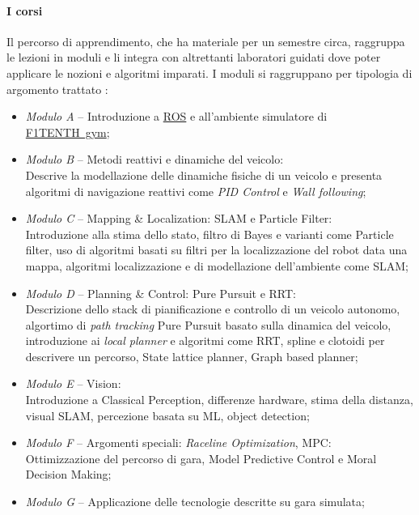 \paragraph{I corsi}
Il percorso di apprendimento, che ha materiale per un semestre circa,
raggruppa le lezioni in moduli e li integra con altrettanti laboratori guidati
dove poter applicare le nozioni e algoritmi imparati.
\newpage %
\noindent I moduli si raggruppano per tipologia di argomento trattato \cite{f1learn}:
\begin{itemize}
	\item \textit{Modulo A} -- Introduzione a \hyperref[sec:ros]{ROS} e 
		all'ambiente simulatore di \hyperref[par:gym]{F1TENTH~gym};
	\item \textit{Modulo B} -- Metodi reattivi e dinamiche del veicolo: \\
	      Descrive la modellazione delle dinamiche fisiche di un veicolo e presenta algoritmi di navigazione
	      reattivi come \textit{PID Control} e \textit{Wall following};
	\item \textit{Modulo C} -- Mapping \& Localization: SLAM e Particle Filter:\\
	      Introduzione alla stima dello stato, filtro di Bayes e varianti come Particle filter, uso di
	      algoritmi basati su filtri per la localizzazione del robot data una mappa, algoritmi localizzazione e
	      di modellazione dell'ambiente come SLAM;
	\item \textit{Modulo D} -- Planning \& Control: Pure Pursuit e RRT:\\
	      Descrizione dello stack di pianificazione e controllo di un veicolo autonomo, algortimo di
	      \textit{path tracking} Pure Pursuit basato sulla dinamica del veicolo, introduzione ai
	      \textit{local planner} e algoritmi come RRT, spline e clotoidi per descrivere un percorso,
	      State lattice planner, Graph based planner;
	\item \textit{Modulo E} -- Vision:\\
	      Introduzione a Classical Perception, differenze hardware, stima della distanza, visual SLAM,
	      percezione basata su ML, object detection;
	\item \textit{Modulo F} -- Argomenti speciali: \textit{Raceline Optimization}, MPC:\\
	      Ottimizzazione del percorso di gara, Model Predictive Control e Moral Decision Making;
	\item \textit{Modulo G} -- Applicazione delle tecnologie descritte su gara simulata;
\end{itemize}

